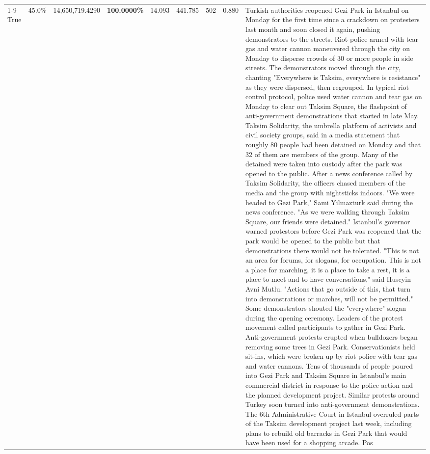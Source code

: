 \begin{table}[H]
\begin{tabular}{lllrlllll}
\cline{1-9}
True & 45.0\% & 14,650,719.4290 & \bfseries \color{red} 100.0000\% & 14.093 & 441.785 & 502 & 0.880 & Turkish authorities reopened Gezi Park in Istanbul on Monday for the first time since a crackdown on protesters last month and soon closed it again, pushing demonstrators to the streets. Riot police armed with tear gas and water cannon maneuvered through the city on Monday to disperse crowds of 30 or more people in side streets. The demonstrators moved through the city, chanting "Everywhere is Taksim, everywhere is resistance" as they were dispersed, then regrouped. In typical riot control protocol, police used water cannon and tear gas on Monday to clear out Taksim Square, the flashpoint of anti-government demonstrations that started in late May. Taksim Solidarity, the umbrella platform of activists and civil society groups, said in a media statement that roughly 80 people had been detained on Monday and that 32 of them are members of the group. Many of the detained were taken into custody after the park was opened to the public. After a news conference called by Taksim Solidarity, the officers chased members of the media and the group with nightsticks indoors. "We were headed to Gezi Park," Sami Yilmazturk said during the news conference. "As we were walking through Taksim Square, our friends were detained." Istanbul's governor warned protestors before Gezi Park was reopened that the park would be opened to the public but that demonstrations there would not be tolerated. "This is not an area for forums, for slogans, for occupation. This is not a place for marching, it is a place to take a rest, it is a place to meet and to have conversations," said Huseyin Avni Mutlu. "Actions that go outside of this, that turn into demonstrations or marches, will not be permitted." Some demonstrators shouted the "everywhere" slogan during the opening ceremony. Leaders of the protest movement called participants to gather in Gezi Park. Anti-government protests erupted when bulldozers began removing some trees in Gezi Park. Conservationists held sit-ins, which were broken up by riot police with tear gas and water cannons. Tens of thousands of people poured into Gezi Park and Taksim Square in Istanbul's main commercial district in response to the police action and the planned development project. Similar protests around Turkey soon turned into anti-government demonstrations. The 6th Administrative Court in Istanbul overruled parts of the Taksim development project last week, including plans to rebuild old barracks in Gezi Park that would have been used for a shopping arcade. Pos \\

\end{tabular}
\end{table}
